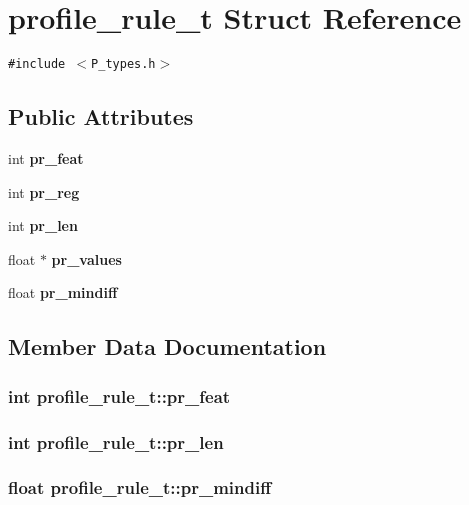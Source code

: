 \section{profile\_\-rule\_\-t  Struct Reference}
\label{structprofile__rule__t}
{\tt \#include $<$P\_\-types.h$>$}

\subsection*{Public Attributes}
\begin{CompactItemize}
\item 
int {\bf pr\_\-feat}
\item 
int {\bf pr\_\-reg}
\item 
int {\bf pr\_\-len}
\item 
float $\ast$ {\bf pr\_\-values}
\item 
float {\bf pr\_\-mindiff}
\end{CompactItemize}


\subsection{Member Data Documentation}
\subsubsection{\setlength{\rightskip}{0pt plus 5cm}int profile\_\-rule\_\-t::pr\_\-feat}\label{structprofile__rule__t_m0}


\subsubsection{\setlength{\rightskip}{0pt plus 5cm}int profile\_\-rule\_\-t::pr\_\-len}\label{structprofile__rule__t_m2}


\subsubsection{\setlength{\rightskip}{0pt plus 5cm}float profile\_\-rule\_\-t::pr\_\-mindiff}\label{structprofile__rule__t_m4}


